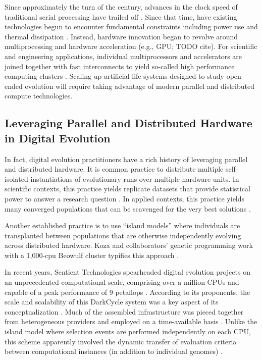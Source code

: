 Since approximately the turn of the century, advances in the clock speed of traditional serial processing have trailed off \citep{sutter2005free}.
Since that time, have existing technologies begun to encounter fundamental constraints including power use and thermal dissipation \citep{markov2014limits}.
Instead, hardware innovation began to revolve around multiprocessing  \citep[p.55]{hennessy2011computer} and hardware acceleration (e.g., GPU; TODO cite).
For scientific and engineering applications, individual multiprocessors and accelerators are joined together with fast interconnects to yield so-called high performance computing clusters \citep[p.436]{hennessy2011computer}.
Scaling up artificial life systems designed to study open-ended evolution will require taking advantage of modern parallel and distributed compute technologies.

\subsection{Leveraging Parallel and Distributed Hardware in Digital Evolution}

In fact, digital evolution practitioners have a rich history of leveraging parallel and distributed hardware.
It is common practice to distribute multiple self-isolated instantiations of evolutionary runs over multiple hardware units.
In scientific contexts, this practice yields replicate datasets that provide statistical power to answer a research question \citep{dolson2017spatial}.
In applied contexts, this practice yields many converged populations that can be scavenged for the very best solutions \citep{hornby2006automated}.

Another established practice is to use ``island models'' where individuals are transplanted between populations that are otherwise independently evolving across distributed hardware.
Koza and collaborators' genetic programming work with a 1,000-cpu Beowulf cluster typifies this approach \citep{bennett1999building}.

In recent years, Sentient Technologies spearheaded digital evolution projects on an unprecedented computational scale, comprising over a million CPUs and capable of a peak performance of 9 petaflops \citep{miikkulainen2019evolving}.
According to its proponents, the scale and scalability of this DarkCycle system was a key aspect of its conceptualization \citep{gilbert_2015}.
Much of the assembled infrastructure was pieced together from heterogeneous providers and employed on a time-available basis \citep{blondeau2012distributed}.
Unlike the island model where selection events are performed independently on each CPU, this scheme apparently involved the dynamic transfer of evaluation criteria between computational instances (in addition to individual genomes) \citep{hodjat2013distributed}.

